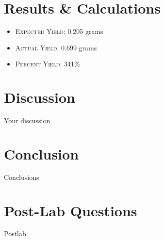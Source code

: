 \documentclass[11pt,letterpaper]{report}
\begin{document}
\section*{Results \& Calculations}
\begin{itemize}
\item \textsc{Expected Yield:} 0.205 grams
\item \textsc{Actual Yield:} 0.699 grams
\item \textsc{Percent Yield:} 341\%
\end{itemize}

\section*{Discussion}
Your discussion

\section*{Conclusion}
Conclusions

\section*{Post-Lab Questions}
Postlab
\end{document}
